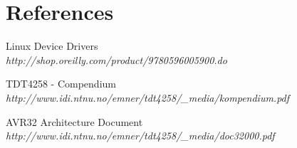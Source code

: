 \section{References}

\begin{enumerate}
	 Linux Device Drivers\\
		\emph{http://shop.oreilly.com/product/9780596005900.do}

	 TDT4258 - Compendium\\
		\emph{http://www.idi.ntnu.no/emner/tdt4258/\_media/kompendium.pdf}

	 AVR32 Architecture Document\\
		\emph{http://www.idi.ntnu.no/emner/tdt4258/\_media/doc32000.pdf}

\end{enumerate}
